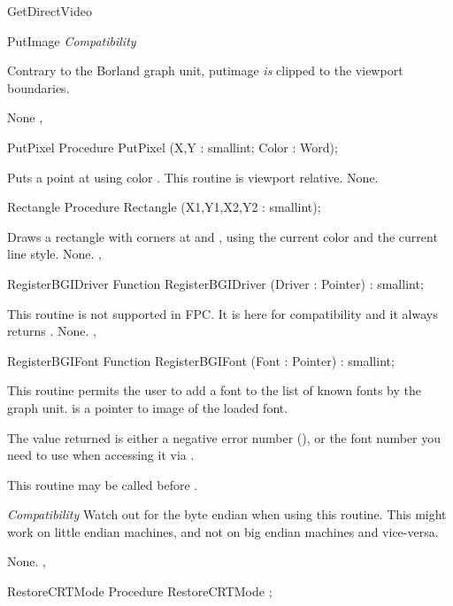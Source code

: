 \begin{function}{GetDirectVideo}
\begin{procedure}{PutImage}
\textit{Compatibility}

Contrary to the Borland graph unit, putimage \textit{is} clipped to the
viewport boundaries.

\Errors
None
\SeeAlso
{},
\end{procedure}
\begin{procedure}{PutPixel}
\Declaration
Procedure PutPixel (X,Y : smallint; Color : Word);

\Description
Puts a point at
 using color . This routine is viewport
relative.
\Errors
None.
\SeeAlso
{}
\end{procedure}
\begin{procedure}{Rectangle}
\Declaration
Procedure Rectangle (X1,Y1,X2,Y2 : smallint);

\Description
Draws a rectangle with
corners at  and , using the current color and
the current line style.
\Errors
None.
\SeeAlso
{}, 
\end{procedure}
\begin{function}{RegisterBGIDriver}
\Declaration
Function RegisterBGIDriver (Driver : Pointer) : smallint;

\Description
This routine is not supported in FPC. It is here for compatibility and it
always returns .
\Errors
None.
\SeeAlso
{},
\end{function}
\begin{function}{RegisterBGIFont}
\Declaration
Function RegisterBGIFont (Font : Pointer) : smallint;

\Description
This routine permits the user to add a font to the list of known fonts
by the graph unit.  is a pointer to image of the loaded font.

The value returned is either a negative error number (),
or the font number you need to use when accessing it via .

This routine may be called before .


\textit{Compatibility}
Watch out for the byte endian when using this routine. This might work
on little endian machines, and not on big endian machines and vice-versa.


\Errors
None.
\SeeAlso
{},
\end{function}
\begin{procedure}{RestoreCRTMode}
\Declaration
Procedure RestoreCRTMode ;


\end{procedure}
\end{function}
